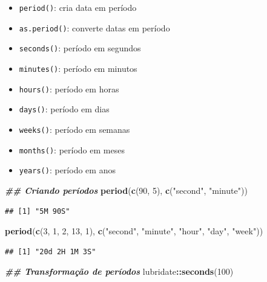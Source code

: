 \documentclass[
]{article}
\newenvironment{Shaded}{\begin{snugshade}}{\end{snugshade}}
\newcommand{\DecValTok}[1]{\textcolor[rgb]{0.00,0.00,0.81}{#1}}
\newcommand{\DocumentationTok}[1]{\textcolor[rgb]{0.56,0.35,0.01}{\textbf{\textit{#1}}}}
\newcommand{\FunctionTok}[1]{\textcolor[rgb]{0.13,0.29,0.53}{\textbf{#1}}}
\newcommand{\NormalTok}[1]{#1}
\newcommand{\SpecialCharTok}[1]{\textcolor[rgb]{0.81,0.36,0.00}{\textbf{#1}}}
\newcommand{\StringTok}[1]{\textcolor[rgb]{0.31,0.60,0.02}{#1}}
\providecommand{\tightlist}{%
  \setlength{\itemsep}{0pt}\setlength{\parskip}{0pt}}
\begin{document}
\begin{itemize}
\tightlist
\item
  \texttt{period()}: cria data em período
\item
  \texttt{as.period()}: converte datas em período
\item
  \texttt{seconds()}: período em segundos
\item
  \texttt{minutes()}: período em minutos
\item
  \texttt{hours()}: período em horas
\item
  \texttt{days()}: período em dias
\item
  \texttt{weeks()}: período em semanas
\item
  \texttt{months()}: período em meses
\item
  \texttt{years()}: período em anos
\end{itemize}

\begin{Shaded}
\begin{Highlighting}[]
\DocumentationTok{\#\# Criando períodos}
\FunctionTok{period}\NormalTok{(}\FunctionTok{c}\NormalTok{(}\DecValTok{90}\NormalTok{, }\DecValTok{5}\NormalTok{), }\FunctionTok{c}\NormalTok{(}\StringTok{"second"}\NormalTok{, }\StringTok{"minute"}\NormalTok{))}
\end{Highlighting}
\end{Shaded}

\begin{verbatim}
## [1] "5M 90S"
\end{verbatim}

\begin{Shaded}
\begin{Highlighting}[]
\FunctionTok{period}\NormalTok{(}\FunctionTok{c}\NormalTok{(}\DecValTok{3}\NormalTok{, }\DecValTok{1}\NormalTok{, }\DecValTok{2}\NormalTok{, }\DecValTok{13}\NormalTok{, }\DecValTok{1}\NormalTok{), }\FunctionTok{c}\NormalTok{(}\StringTok{"second"}\NormalTok{, }\StringTok{"minute"}\NormalTok{, }\StringTok{"hour"}\NormalTok{, }\StringTok{"day"}\NormalTok{, }\StringTok{"week"}\NormalTok{))}
\end{Highlighting}
\end{Shaded}

\begin{verbatim}
## [1] "20d 2H 1M 3S"
\end{verbatim}

\begin{Shaded}
\begin{Highlighting}[]
\DocumentationTok{\#\# Transformação de períodos}
\NormalTok{lubridate}\SpecialCharTok{::}\FunctionTok{seconds}\NormalTok{(}\DecValTok{100}\NormalTok{)}
\end{Highlighting}
\end{Shaded}
\end{document}
